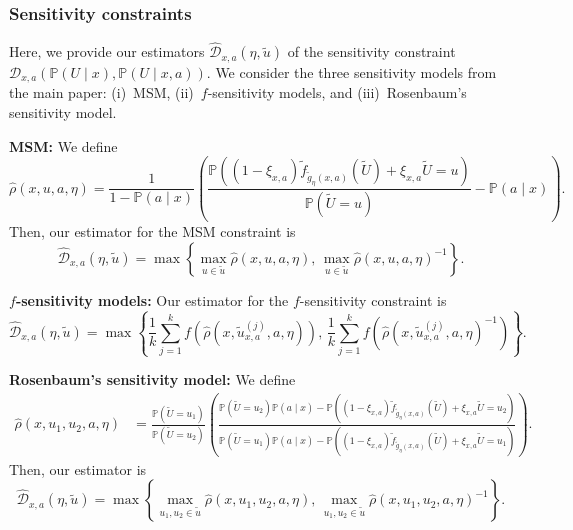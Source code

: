 \documentclass{article} %
\theoremstyle{definition}
\theoremstyle{plain}
\begin{document}
\subsubsection{Sensitivity constraints}

Here, we provide our estimators $\hat{\mathcal{D}}_{x, a}(\eta, \widetilde{u})$ of the sensitivity constraint $\mathcal{D}_{x, a}(\mathbb{P}(U \mid x), \mathbb{P}(U \mid x, a))$. We consider the three sensitivity models from the main paper: (i)~MSM, (ii)~$f$-sensitivity models, and (iii)~Rosenbaum's sensitivity model.

\textbf{MSM:} We define
\begin{equation}
    \hat{\rho}(x, u, a, \eta) = \frac{1}{1 - \mathbb{P}(a \mid x)} \left(\frac{ \mathbb{P} \left((1 - \xi_{x, a}) \widetilde{f}_{\widetilde{g}_\eta(x, a)}(\widetilde{U}) +  \xi_{x, a} \widetilde{U} = u \right)}{\mathbb{P}(\widetilde{U} = u)} - \mathbb{P}(a \mid x) \right).
\end{equation}
Then, our estimator for the MSM constraint is
\begin{equation}
   \hat{\mathcal{D}}_{x, a}(\eta, \widetilde{u}) =  \max\left\{\max_{u \in \widetilde{u}} \hat{\rho}(x, u, a, \eta), \, \max_{u \in \widetilde{u}} \hat{\rho}(x, u, a, \eta)^{-1} \right\}.
\end{equation}

\textbf{$f$-sensitivity models:} Our estimator for the $f$-sensitivity constraint is
\begin{equation}
\hat{\mathcal{D}}_{x, a}(\eta, \widetilde{u}) = \max\left\{\frac{1}{k}\sum_{j=1}^k f(\hat{\rho}(x, \widetilde{u}^{(j)}_{x, a}, a, \eta)),  \, \frac{1}{k}\sum_{j=1}^k f(\hat{\rho}(x, \widetilde{u}^{(j)}_{x, a}, a, \eta)^{-1}) \right\}.
\end{equation}

\textbf{Rosenbaum's sensitivity model:} We define
\begin{align}
    \hat{\rho}(x, u_1, u_2, a, \eta) &= \frac{\mathbb{P}(\widetilde{U} = u_1)}{\mathbb{P}(\widetilde{U} = u_2)}\left(\frac{\mathbb{P}(\widetilde{U} = u_2) \mathbb{P}(a \mid x) - \mathbb{P} \left((1 - \xi_{x, a}) \widetilde{f}_{\widetilde{g}_\eta(x, a)}(\widetilde{U}) +  \xi_{x, a} \widetilde{U} = u_2 \right)}{\mathbb{P}(\widetilde{U} = u_1) \mathbb{P}(a \mid x) - \mathbb{P} \left((1 - \xi_{x, a}) \widetilde{f}_{\widetilde{g}_\eta(x, a)}(\widetilde{U}) +  \xi_{x, a} \widetilde{U} = u_1 \right)} \right).
\end{align}
Then, our estimator is
\begin{equation}
   \hat{\mathcal{D}}_{x, a}(\eta, \widetilde{u}) =  \max\left\{\max_{u_1, u_2 \in \widetilde{u}} \hat{\rho}(x, u_1, u_2, a, \eta), \, \max_{u_1, u_2 \in \widetilde{u}} \hat{\rho}(x, u_1, u_2, a, \eta)^{-1} \right\}.
\end{equation}
\end{document}
